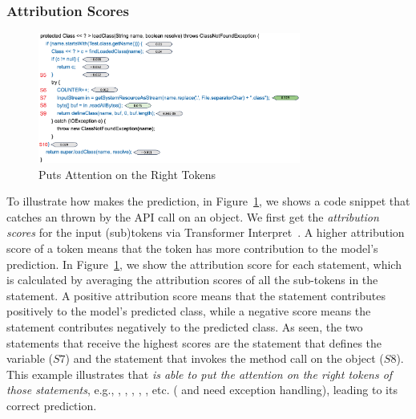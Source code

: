 \subsubsection{Attribution Scores}

\begin{figure}[t]
 	\centering
 	\includegraphics[width=3.4in]{rq1-case-study.png}
        \vspace{-20pt}
 	\caption{{\xblock} Puts Attention on the Right Tokens}
 	\label{fig:rq1-case}	
\end{figure}


To illustrate how {\xblock} makes the prediction, in
Figure~\ref{fig:rq1-case}, we shows a code snippet that catches an
 thrown by the  API call on an
 object.
%
We first get the {\em attribution scores} for the input (sub)tokens
via Transformer Interpret~\cite{transformers-interpret}. A higher
attribution score of a token means that the token has more
contribution to the model's prediction. In Figure~\ref{fig:rq1-case},
we show the attribution score for each statement, which is calculated
by averaging the attribution scores of all the sub-tokens in the
statement.
%
%
A positive attribution score means that the statement contributes
positively to the model's predicted class, while a negative score
means the statement contributes negatively to the predicted class.  As
seen, the two statements that receive the highest scores are the
statement that defines the  variable ($S7$) and the
statement that invokes the  method call on the
 object ($S8$). This example illustrates that {\em {\tool}
  is able to put the attention on the right tokens of those
  statements}, e.g., , , ,
, , etc. ( and  need exception handling), leading to its correct prediction.


